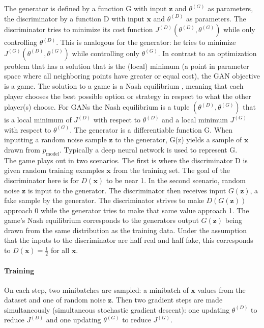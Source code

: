 The generator is defined by a function G with input $\mathbf{z}$ and $\theta^{(G)}$ as parameters, the discriminator by a function D with input $\mathbf{x}$ and $\theta^{(D)}$ as parameters. The discriminator tries to minimize its cost function $J^{(D)}(\theta^{(D)}, \theta^{(G)})$ while only controlling $\theta^{(D)}$. This is analogous for the generator: he tries to minimize $J^{(G)}(\theta^{(D)}, \theta^{(G)})$ while controlling only $\theta^{(G)}$. In contrast to an optimization problem that has a solution that is the (local) minimum (a point in parameter space where all neighboring points have greater or equal cost), the GAN objective is a game. The solution to a game is a Nash equilibrium \cite{Nash48}, meaning that each player chooses the best possible option or strategy in respect to what the other player(s) choose. For GANs the Nash equilibrium is a tuple $(\theta^{(D)}, \theta^{(G)})$ that is a local minimum of $J^{(D)}$ with respect to $\theta^{(D)}$ and a local minimum $J^{(G)}$ with respect to $\theta^{(G)}$.
The generator is a differentiable function G. When inputting a random noise sample $\mathbf{z}$ to the generator, G(z) yields a sample of $\mathbf{x}$ drawn from $p_{\text{model}}$. Typically a deep neural network is used to represent G. \\
The game plays out in two scenarios. The first is where the discriminator D is given random training examples $\mathbf{x}$ from the training set. The goal of the discriminator here is for $D(\mathbf{x})$ to be near 1. In the second scenario, random noise $\mathbf{z}$ is input to the generator. The discriminator then receives input $G(\mathbf{z})$, a fake sample by the generator. The discriminator strives to make $D(G(\mathbf{z}))$ approach 0 while the generator tries to make that same value approach 1. The game's Nash equilibrium corresponds to the generators output $G(\mathbf{z})$ being drawn from the same distribution as the training data. Under the assumption that the inputs to the discriminator are half real and half fake, this corresponds to $D(\mathbf{x}) = \frac{1}{2}$ for all $\mathbf{x}$.

\paragraph{Training}
On each step, two minibatches are sampled: a minibatch of $\mathbf{x}$ values from the dataset and one of random noise $\mathbf{z}$. Then two gradient steps are made simultaneously (simultaneous stochastic gradient descent): one updating $\theta^{(D)}$ to reduce $J^{(D)}$ and one updating $\theta^{(G)}$ to reduce $J^{(G)}$.

